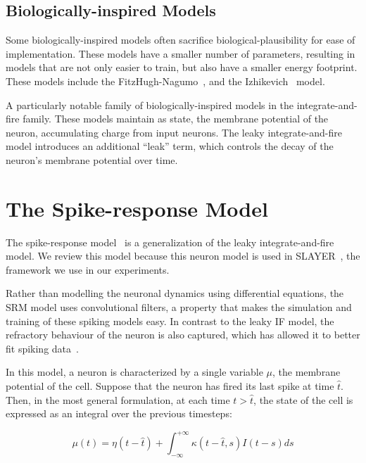 \documentclass[fyp]{socreport}
\begin{document}
\subsection{Biologically-inspired Models}
Some biologically-inspired models often sacrifice biological-plausibility for
ease of implementation. These models have a smaller number of parameters,
resulting in models that are not only easier to train, but also have a smaller
energy footprint. These models include the
FitzHugh-Nagumo~\cite{fitzhugh1955mathematical}, and the
Izhikevich~\cite{izhikevich2003simple} model.

A particularly notable family of biologically-inspired models in the
integrate-and-fire family. These models maintain as state, the membrane
potential of the neuron, accumulating charge from input neurons. The leaky
integrate-and-fire model introduces an additional ``leak'' term, which controls
the decay of the neuron's membrane potential over time.

\section{The Spike-response Model\label{sec:spike-response-model}}

The spike-response model~\cite{gerstner2001framework} is a generalization of the
leaky integrate-and-fire model. We review this model because this neuron model
is used in SLAYER~\cite{NIPS2018_7415}, the framework we use in our experiments.

Rather than modelling the neuronal dynamics using differential equations, the
SRM model uses convolutional filters, a property that makes the simulation and
training of these spiking models easy. In contrast to the leaky IF model, the
refractory behaviour of the neuron is also captured, which has allowed it to
better fit spiking data~\cite{jolivet04_gener_integ_and_fire_model}.

In this model, a neuron is characterized by a single variable $\mu$, the
membrane potential of the cell. Suppose that the neuron has fired its last spike
at time $\hat{t}$. Then, in the most general formulation, at each time
$t > \hat{t}$, the state of the cell is expressed as an integral over the
previous timesteps:

\begin{equation}
  \label{eq:srm}
  \mu(t) = \eta(t - \hat{t}) + \int_{-\infty}^{+\infty}\kappa(t - \hat{t}, s)I(t - s) ds
\end{equation}
\end{document}
